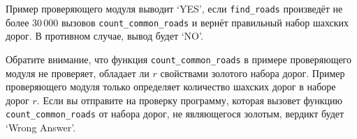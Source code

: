 Пример проверяющего модуля выводит `YES', если \texttt{find\_roads} произведёт не более $30\,000$ вызовов \texttt{count\_common\_roads} и вернёт правильный набор шахских дорог. В противном случае, вывод будет `NO'.


Обратите внимание, что функция \texttt{count\_common\_roads} в примере проверяющего модуля не проверяет, обладает ли $r$ свойствами золотого набора дорог. Пример проверяющего модуля
только определяет количество шахских дорог в наборе дорог $r$. Если вы отправите на
проверку программу, которая вызовет функцию \texttt{count\_common\_roads} от набора дорог, не являющегося золотым, вердикт будет `Wrong Answer'.